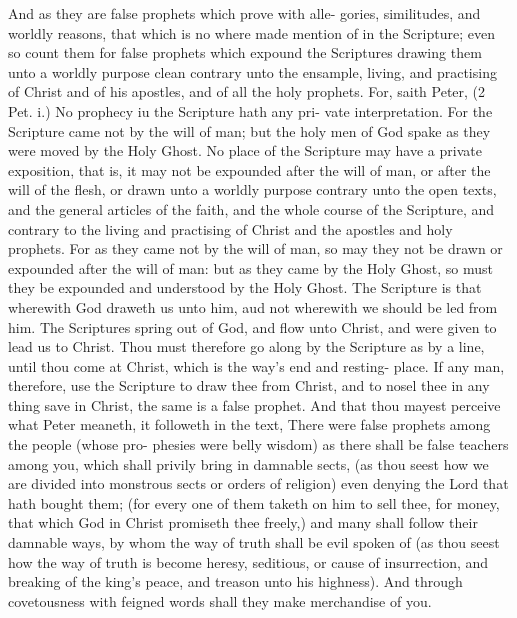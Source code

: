 \documentclass{custom}
\begin{document}
And as they are false prophets which prove with alle- 
gories, similitudes, and worldly reasons, that which is no 
where made mention of in the Scripture; even so count 
them for false prophets which expound the Scriptures 
drawing them unto a worldly purpose clean contrary unto 
the ensample, living, and practising of Christ and of his 
apostles, and of all the holy prophets. For, saith Peter, 
(2 Pet. i.) No prophecy iu the Scripture hath any pri- 
vate interpretation. For the Scripture came not by the will 
of man; but the holy men of God spake as they were 
moved by the Holy Ghost. No place of the Scripture may 
have a private exposition, that is, it may not be expounded 
after the will of man, or after the will of the flesh, or drawn 
unto a worldly purpose contrary unto the open texts, and 
the general articles of the faith, and the whole course of the 
Scripture, and contrary to the living and practising of 
Christ and the apostles and holy prophets. For as they 
came not by the will of man, so may they not be drawn or 
expounded after the will of man: but as they came by the 
Holy Ghost, so must they be expounded and understood by 
the Holy Ghost. The Scripture is that wherewith God 
draweth us unto him, aud not wherewith we should be led 
from him. The Scriptures spring out of God, and flow 
unto Christ, and were given to lead us to Christ. Thou 
must therefore go along by the Scripture as by a line, until 
thou come at Christ, which is the way's end and resting- 
place. If any man, therefore, use the Scripture to draw 
thee from Christ, and to nosel thee in any thing save in 
Christ, the same is a false prophet. And that thou mayest 
perceive what Peter meaneth, it followeth in the text, 
There were false prophets among the people (whose pro- 
phesies were belly wisdom) as there shall be false teachers 
among you, which shall privily bring in damnable sects, 
(as thou seest how we are divided into monstrous sects or 
orders of religion) even denying the Lord that hath 
bought them; (for every one of them taketh on him to 
sell thee, for money, that which God in Christ promiseth 
thee freely,) and many shall follow their damnable ways, 
by whom the way of truth shall be evil spoken of (as thou 
seest how the way of truth is become heresy, seditious, or 
cause of insurrection, and breaking of the king's peace, 
and treason unto his highness). And through covetousness 
with feigned words shall they make merchandise of you. 
\end{document}
